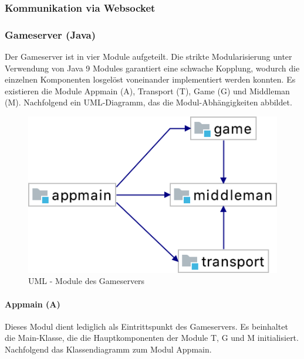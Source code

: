 \documentclass[11pt,ngerman]{article}
\begin{document}

    \subsubsection{Kommunikation via Websocket}

    \subsubsection{Gameserver  (Java)}
	Der Gameserver ist in vier Module aufgeteilt. Die strikte Modularisierung unter Verwendung von Java 9 Modules garantiert eine schwache Kopplung, wodurch die einzelnen Komponenten losgelöst voneinander implementiert werden konnten. Es existieren die Module Appmain (A), Transport (T), Game (G) und Middleman (M). Nachfolgend ein UML-Diagramm, das die Modul-Abhängigkeiten abbildet.

	\begin{figure}[H]
    	\centering
    	\includegraphics[scale=0.5]{figures/gameserver-uml/modules.png}
    	\caption{UML - Module des Gameservers}
    	\label{fig:UMLModule}
    \end{figure}
	
	\paragraph{Appmain (A)}
	Dieses Modul dient lediglich als Eintrittspunkt des Gameservers. Es beinhaltet die Main-Klasse, die die Hauptkomponenten der Module T, G und M initialisiert. Nachfolgend das Klassendiagramm zum Modul Appmain.
\end{document}
